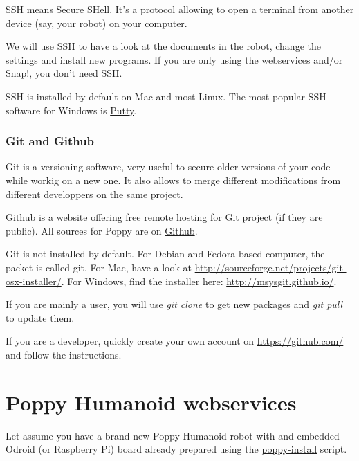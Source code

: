 \documentclass{article}
\begin{document}
SSH means Secure SHell. It's a protocol allowing to open a terminal from another device (say, your robot) on your computer.

We will use SSH to have a look at the documents in the robot, change the settings and install new programs. If you are only using the webservices and/or Snap!, you don't need SSH.

SSH is installed by default on Mac and most Linux. The most popular SSH software for Windows is \href{http://www.putty.org/}{Putty}.

\subsubsection{Git and Github}

Git is a versioning software, very useful to secure older versions of your code while workig on a new one. It also allows to merge different modifications from different developpers on the same project.

Github is a website offering free remote hosting for Git project (if they are public). All sources for Poppy are on \href{https://github.com/poppy-project}{Github}.

Git is not installed by default. For Debian and Fedora based computer, the packet is called git. For Mac, have a look at \url{http://sourceforge.net/projects/git-osx-installer/}. For Windows, find the installer here: \url{http://msysgit.github.io/}.

If you are mainly a user, you will use \textit{git clone} to get new packages and \textit{git pull} to update them.

If you are a developer, quickly create your own account on \url{https://github.com/} and follow the instructions.



\section{Poppy Humanoid webservices}
\label{poppy-webservices}

Let assume you have a brand new Poppy Humanoid robot with and embedded Odroid (or Raspberry Pi) board already prepared using the \href{https://github.com/poppy-project/poppy_install}{poppy-install} script.
\end{document}
